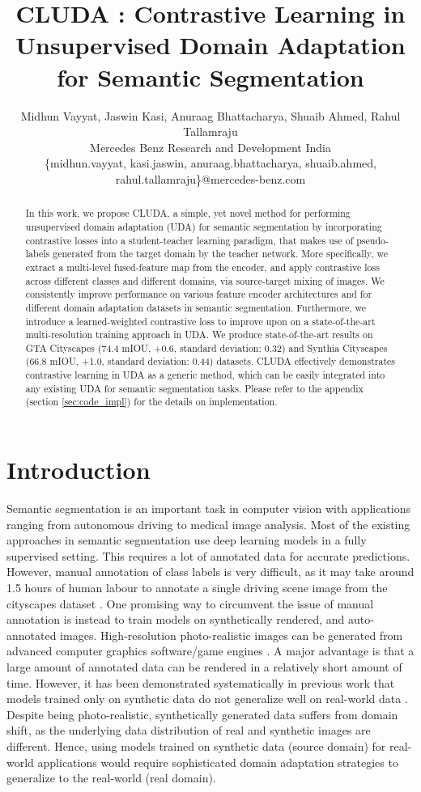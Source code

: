 \documentclass{article}
\title{CLUDA : Contrastive Learning in Unsupervised Domain Adaptation for Semantic Segmentation}
\author{
    Midhun Vayyat, Jaswin Kasi, Anuraag Bhattacharya, Shuaib Ahmed, Rahul Tallamraju\\
    Mercedes Benz Research and Development India \\
\{midhun.vayyat, kasi.jaswin, anuraag.bhattacharya, shuaib.ahmed, rahul.tallamraju\}@mercedes-benz.com \\
}
\begin{document}
\maketitle


\begin{abstract}
  In this work, we propose CLUDA, a simple, yet novel method for performing unsupervised domain adaptation (UDA) for semantic segmentation by incorporating contrastive losses into a student-teacher learning paradigm, that makes use of pseudo-labels generated from the target domain by the teacher network. More specifically, we extract a multi-level fused-feature map from the encoder, and apply contrastive loss across different classes and different domains, via source-target mixing of images. We consistently improve performance on various feature encoder architectures and for different domain adaptation datasets in semantic segmentation. Furthermore, we introduce a learned-weighted contrastive loss to improve upon on a state-of-the-art multi-resolution training approach in UDA. We produce state-of-the-art results on GTA  Cityscapes (74.4 mIOU, +0.6, standard deviation: 0.32) and Synthia  Cityscapes (66.8 mIOU, +1.0, standard deviation: 0.44) datasets. CLUDA effectively demonstrates contrastive learning in UDA as a generic method, which can be easily integrated into any existing UDA for semantic segmentation tasks. Please refer to the appendix (section \ref{sec:code_impl}) for the details on implementation.
\end{abstract}
\section{Introduction}
Semantic segmentation is an important task in computer vision with applications ranging from autonomous driving to medical image analysis.  Most of the existing approaches in semantic segmentation \cite{liu2021domain, musto2020semantically, zhang2021prototypical, zhao2021contrastive, wang2021cross} use deep learning models in a fully supervised setting. This requires a lot of annotated data for accurate predictions. However, manual annotation of class labels is very difficult, as it may take around 1.5 hours of human labour to annotate a single driving scene image from the cityscapes dataset \cite{sakaridis2021acdc, hoyer2021daformer}.
One promising way to circumvent the issue of manual annotation is instead to train models on synthetically rendered, and auto-annotated images. High-resolution photo-realistic images can be generated from advanced computer graphics software/game engines \cite{richter2016playing, varol2017learning}. A major advantage is that a large amount of annotated data can be rendered in a relatively short amount of time. However, it has been demonstrated systematically in previous work that models trained only on synthetic data do not generalize well on real-world data \cite{zou2018unsupervised}. Despite being photo-realistic, synthetically generated data suffers from domain shift, as the underlying data distribution of real and synthetic images are different. Hence, using models trained on synthetic data (source domain) for real-world applications would require sophisticated domain adaptation strategies to generalize to the real-world (real domain).
\end{document}
